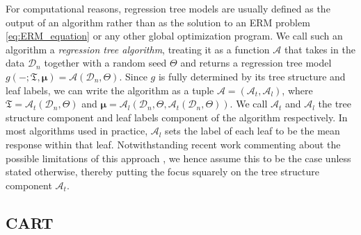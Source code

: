 \documentclass[11pt]{article}
\newcommand{\bmu}{\boldsymbol{\mu}}
\newcommand{\tree}{\mathfrak{T}}
\newcommand{\cell}{\mathcal{C}}
\newcommand{\data}[1][n]{\mathcal{D}_{#1}}
\newcommand{\splitrule}{\mathcal{R}_{\textnormal{split}}}
\newcommand{\alg}{\mathcal{A}}
\newcommand{\splitfeature}{k}
\begin{document}
For computational reasons, regression tree models are usually defined as the output of an algorithm rather than as the solution to an ERM problem \eqref{eq:ERM_equation} or any other global optimization program.
We call such an algorithm a \emph{regression tree algorithm}, treating it as a function $\alg$ that takes in the data $\data$ together with a random seed $\Theta$ and returns a regression tree model $g(-;\tree,\bmu) = \alg(\data,\Theta)$.
Since $g$ is fully determined by its tree structure and leaf labels, we can write the algorithm as a tuple $\alg = (\alg_t,\alg_l)$, where $\tree = \alg_t(\data,\Theta)$ and $\bmu = \alg_l(\data,\Theta,\alg_t(\data,\Theta))$.
We call $\alg_t$ and $\alg_l$ the tree structure component and leaf labels component of the algorithm respectively.
In most algorithms used in practice, $\alg_l$ sets the label of each leaf to be the mean response within that leaf.
Notwithstanding recent work commenting about the possible limitations of this approach \citep{tan2021cautionary,agarwal2022hierarchical}, we hence assume this to be the case unless stated otherwise, thereby putting the focus squarely on the tree structure component $\alg_t$.





\subsection{CART}
\end{document}
